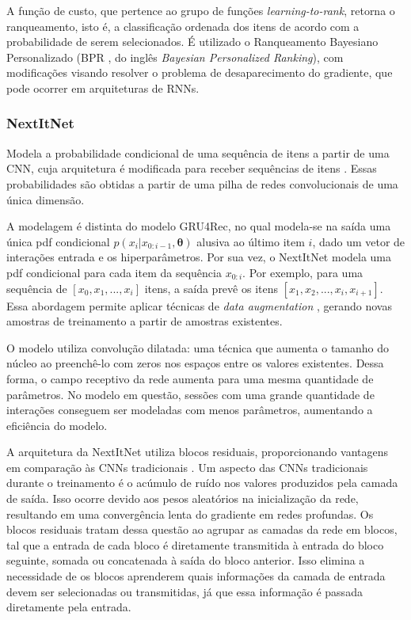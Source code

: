 A função de custo, que pertence ao grupo de funções \textit{learning-to-rank},
retorna o ranqueamento, isto é, a classificação ordenada dos itens de acordo com
a probabilidade de serem selecionados. É utilizado o Ranqueamento Bayesiano
Personalizado (BPR \cite{rendle2009}, do inglês \textit{Bayesian Personalized
Ranking}), com modificações visando resolver o problema de desaparecimento do
gradiente, que pode ocorrer em arquiteturas de RNNs.

\subsubsection{NextItNet}
Modela a probabilidade condicional de uma sequência de itens a partir de uma
CNN, cuja arquitetura é modificada para receber sequências de itens
\cite{nextitnet}. Essas probabilidades são obtidas a partir de uma pilha de
redes convolucionais de uma única dimensão.

A modelagem é distinta do modelo GRU4Rec, no qual modela-se na saída uma única
pdf condicional $p(x_i|x_{0:i-1}, \mathbf{\theta})$ alusiva ao último item $i$,
dado um vetor de interações entrada e os hiperparâmetros. Por sua vez, o
NextItNet modela uma pdf condicional para cada item da sequência $x_{0:i}$. Por
exemplo, para uma sequência de $[x_0, x_1, ..., x_i]$ itens, a saída prevê os
itens $[x_1, x_2, ..., x_i, x_{i+1}]$. Essa abordagem permite aplicar técnicas
de \textit{data augmentation} \cite{tan2016improved}, gerando novas amostras de
treinamento a partir de amostras existentes.

O modelo utiliza convolução dilatada: uma técnica que aumenta o tamanho do
núcleo ao preenchê-lo com zeros nos espaços entre os valores existentes. Dessa
forma, o campo receptivo da rede aumenta para uma mesma quantidade de
parâmetros. No modelo em questão, sessões com uma grande quantidade de
interações conseguem ser modeladas com menos parâmetros, aumentando a eficiência
do modelo.

A arquitetura da NextItNet utiliza blocos residuais, proporcionando vantagens em
comparação às CNNs tradicionais \cite{he2016deep}. Um aspecto das CNNs
tradicionais durante o treinamento é o acúmulo de ruído nos valores produzidos
pela camada de saída. Isso ocorre devido aos pesos aleatórios na inicialização
da rede, resultando em uma convergência lenta do gradiente em redes profundas.  Os blocos residuais tratam dessa questão ao agrupar as camadas da rede em
blocos, tal que a entrada de cada bloco é diretamente transmitida à entrada do
bloco seguinte, somada ou concatenada à saída do bloco anterior. Isso elimina a
necessidade de os blocos aprenderem quais informações da camada de entrada devem
ser selecionadas ou transmitidas, já que essa informação é passada diretamente
pela entrada.

